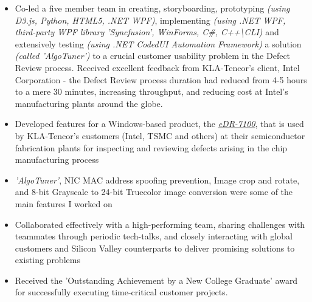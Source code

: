 \vspace{1.8mm}
	\begin{itemize}
		\setlength\itemsep{0.3em}
		\item Co-led a five member team in creating, storyboarding, prototyping \emph{(using D3.js, Python, HTML5, .NET WPF)}, implementing \emph{(using .NET WPF, third-party WPF library 'Syncfusion', WinForms, C\#, C++\textbackslash CLI)} and extensively testing \emph{(using .NET CodedUI Automation Framework)} a solution \emph{(called 'AlgoTuner')} to a crucial customer usability problem in the Defect Review process. Received excellent feedback from KLA-Tencor's client, Intel Corporation - the Defect Review process duration had reduced from 4-5 hours to a mere 30 minutes, increasing throughput, and reducing cost at Intel's manufacturing plants around the globe.
		\item Developed features for a Windows-based product, the \href{http://www.kla-tencor.com/Defect-Review/edr-7100-series.html}{\emph{eDR-7100}}, that is used by KLA-Tencor's customers (Intel, TSMC and others) at their semiconductor fabrication plants for inspecting and reviewing defects arising in the chip manufacturing process 
		\item \emph{'AlgoTuner'}, NIC MAC address spoofing prevention, Image crop and rotate, and 8-bit Grayscale to 24-bit Truecolor image conversion were some of the main features I worked on
		\item Collaborated effectively with a high-performing team, sharing challenges with teammates through periodic tech-talks, and closely interacting with global customers and Silicon Valley counterparts to deliver promising solutions to existing problems
		\item Received the 'Outstanding Achievement by a New College Graduate' award for successfully executing time-critical customer projects.
	\end{itemize}
	
\vspace{1.8mm}
	
